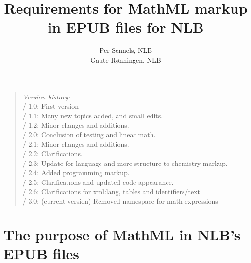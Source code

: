 \documentclass[english,a4paper,11pt]{article}
\title{Requirements for MathML markup\\ in EPUB files for NLB}
\author{Per Sennels, NLB\\Gaute Rønningen, NLB}
\begin{document}
	\bunntekst
	\thispagestyle{empty}
	\raggedright
	
	\maketitle
	\thispagestyle{empty}
	\vfill
	\begin{quote} {
		\bigskip
		\emph{Version history:}\\
		\textbullet{} / 1.0: First version\\
		\textbullet{} / 1.1: Many new topics added, and small edits.\\
		\textbullet{} / 1.2: Minor changes and additions.\\
		\textbullet{} / 2.0: Conclusion of testing and linear math.\\
        \textbullet{} / 2.1: Minor changes and additions.\\
        \textbullet{} / 2.2: Clarifications.\\
        \textbullet{} / 2.3: Update for language and more structure to chemistry markup.\\
        \textbullet{} / 2.4: Added programming markup.\\
        \textbullet{} / 2.5: Clarifications and updated code appearance.\\
        \textbullet{} / 2.6: Clarifications for xml:lang, tables and identifiers/text.\\
        \textbullet{} / 3.0: (current version) Removed namespace for math expressions\\
        \bigskip
	}
	\end{quote}
	\vfill
	\pagebreak
	\tableofcontents
	\vfill
	\pagebreak

\section{The purpose of MathML in NLB's EPUB files}
\end{document}
